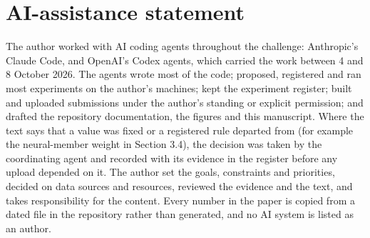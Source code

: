 \documentclass[
  manuscript=article,  %
  layout=preprint,     %
  year=2026,
  volume=4,
]{extra/joas}
\begin{document}
\section*{AI-assistance statement}\label{ai-assistance-statement}

The author worked with AI coding agents throughout the challenge: Anthropic's Claude Code, and OpenAI's Codex agents, which carried the work between 4 and 8 October 2026. The agents wrote most of the code; proposed, registered and ran most experiments on the author's machines; kept the experiment register; built and uploaded submissions under the author's standing or explicit permission; and drafted the repository documentation, the figures and this manuscript. Where the text says that a value was fixed or a registered rule departed from (for example the neural-member weight in Section 3.4), the decision was taken by the coordinating agent and recorded with its evidence in the register before any upload depended on it. The author set the goals, constraints and priorities, decided on data sources and resources, reviewed the evidence and the text, and takes responsibility for the content. Every number in the paper is copied from a dated file in the repository rather than generated, and no AI system is listed as an author.

\printbibliography
\end{document}
